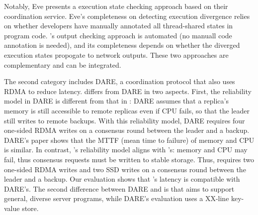 
Notably, Eve presents a execution state checking approach based on their 
coordination service. Eve's completeness on detecting execution divergence 
relies on whether developers have manually annotated all thread-shared states 
in program code. \xxx's output checking approach is automated (no manuall code 
annotation is needed), and its completeness depends on whether the diverged 
execution states propogate to network outputs. These two approaches are 
complementary and can be integrated.

The second category includes DARE, a coordination protocol that also uses RDMA 
to reduce latency. \xxx differs from DARE in two aspects. First, 
the reliability model in DARE is different from that in \paxos: DARE assumes 
that a replica's memory is still accessible to remote replicas even if CPU 
fails, so that the leader still writes to remote backups. With this reliability 
model, DARE requires four one-sided RDMA writes on a consensus round between the 
leader and a backup. DARE's paper shows that the MTTF (mean time to failure) of 
memory and CPU is similar. In contrast, \xxx's reliability model aligns with 
\paxos's: memory and CPU may fail, thus consensus requests must be written to 
stable storage. Thus, \xxx requires two one-sided RDMA writes and two SSD writes 
on a consensus round between the leader and a backup. Our evaluation shows that 
\xxx's latency is compatible with DARE's. The second difference between DARE 
and \xxx is that \xxx aims to support general, diverse server programs, while 
DARE's evaluation uses a XX-line key-value store.





